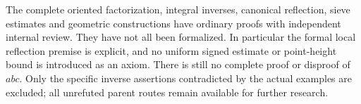 The complete oriented factorization, integral inverses, canonical
reflection, sieve estimates and geometric constructions have ordinary
proofs with independent internal review. They have not all been
formalized. In particular the formal local reflection premise is
explicit, and no uniform signed estimate or point-height bound is
introduced as an axiom. There is still no complete proof or disproof
of $abc$. Only the specific inverse assertions contradicted by the
actual examples are excluded; all unrefuted parent routes remain
available for further research.

